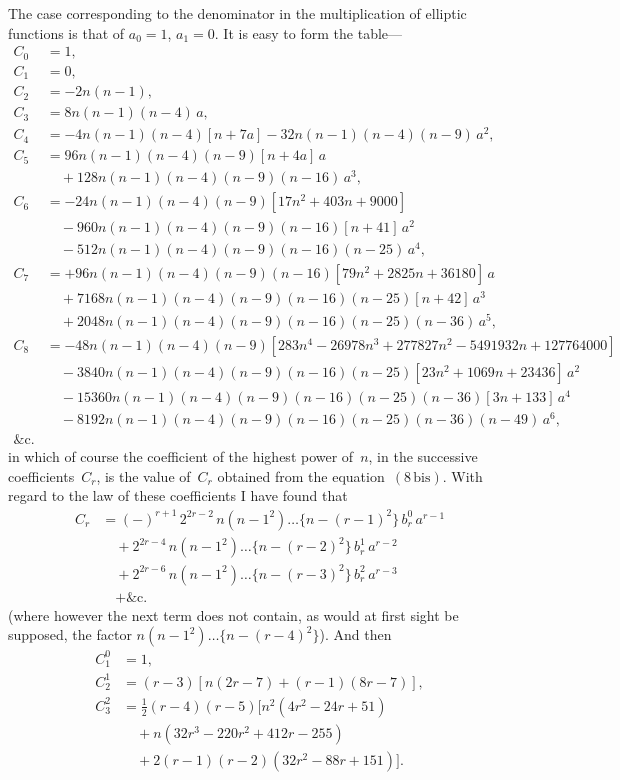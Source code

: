 \documentclass[11pt,a4paper]{book}
\begin{document}
\newpage
The case corresponding to the denominator in the multiplication of elliptic functions is that of $a_0 = 1$, $a_1 = 0$. It is easy to form the table---
\begin{align*}
C_0 &= 1,\\
C_1 &= 0,\\
C_2 &= -2n(n-1),\\
C_3 &= 8n(n-1)(n-4)\,a,\\
C_4 &= -4n(n-1)(n-4)[n+7a] - 32n(n-1)(n-4)(n-9)\,a^2,\\
C_5 &= 96n(n-1)(n-4)(n-9)[n+4a]\,a \\
  &\quad+ 128n(n-1)(n-4)(n-9)(n-16)\,a^3,\\
C_6 &= -24n(n-1)(n-4)(n-9)[17n^2 + 403n + 9000] \\
  &\quad- 960n(n-1)(n-4)(n-9)(n-16)[n+41]\,a^2 \\
  &\quad- 512n(n-1)(n-4)(n-9)(n-16)(n-25)\,a^4,\\
C_7 &= +96n(n-1)(n-4)(n-9)(n-16)[79n^2 + 2825n + 36180]\,a \\
  &\quad+ 7168n(n-1)(n-4)(n-9)(n-16)(n-25)[n+42]\,a^3 \\
  &\quad+ 2048n(n-1)(n-4)(n-9)(n-16)(n-25)(n-36)\,a^5,\\
C_8 &= -48n(n-1)(n-4)(n-9)[283n^4 - 26978n^3 + 277827n^2 - 5491932n + 127764000] \\
  &\quad- 3840n(n-1)(n-4)(n-9)(n-16)(n-25)[23n^2 + 1069n + 23436]\,a^2 \\
  &\quad- 15360n(n-1)(n-4)(n-9)(n-16)(n-25)(n-36)[3n+133]\,a^4 \\
  &\quad- 8192n(n-1)(n-4)(n-9)(n-16)(n-25)(n-36)(n-49)\,a^6,\\
\&\text{c.}
\end{align*}
in which of course the coefficient of the highest power of~$n$, in the successive coefficients~$C_r$, is the value of~$C_r$ obtained from the equation~$(8\,\text{bis})$. With regard to the law of these coefficients I have found that
\begin{align*}
C_r &= (-)^{r+1}\,2^{2r-2}\,n(n-1^2)\ldots\{n-(r-1)^2\}\,b_r^0\,a^{r-1} \\
  &\quad+ 2^{2r-4}\,n(n-1^2)\ldots\{n-(r-2)^2\}\,b_r^1\,a^{r-2} \\
  &\quad+ 2^{2r-6}\,n(n-1^2)\ldots\{n-(r-3)^2\}\,b_r^2\,a^{r-3} \\
  &\quad+ \text{\&c.}
\end{align*}
(where however the next term does not contain, as would at first sight be supposed, the factor $n(n-1^2)\ldots\{n-(r-4)^2\}$). And then
\begin{align*}
C_1^0 &= 1,\\
C_2^1 &= (r-3)[n(2r-7) + (r-1)(8r-7)],\\
C_3^2 &= \tfrac{1}{2}(r-4)(r-5)[n^2(4r^2-24r+51) \\
  &\quad+ n(32r^3-220r^2+412r-255) \\
  &\quad+ 2(r-1)(r-2)(32r^2-88r+151)].
\end{align*}
\end{document}
